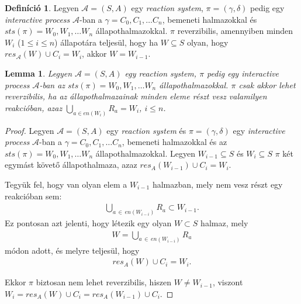 \documentclass[12pt]{article}
\theoremstyle{definition}
\newtheorem*{definition*}{Definíció}
\theoremstyle{remark}
\theoremstyle{plain}
\theoremstyle{plain}
\newtheorem*{lemma*}{Lemma}
\newcommand{\res}{\textit{res}}
\begin{document}
    \begin{definition*}
        Legyen $\mathscr{A} = (S, A)$ egy \textit{reaction system}, $\pi=(\gamma, \delta)$ pedig egy \textit{interactive process} $\mathscr{A}$-ban a $\gamma = C_{0}, C_{1}, \ldots C_{n}$, bemeneti halmazokkal és $\textit{sts}(\pi)=W_{0},W_{1},\ldots W_{n}$ állapothalmazokkal. $\pi$ reverzibilis, amennyiben minden $W_{i}$ ($1 \leq i \leq n$) állapotára teljesül, hogy ha $W \subseteq S$ olyan, hogy $res_{\mathscr{A}}(W) \cup C_{i} = W_{i}$, akkor $W = W_{i - 1}$.
    \end{definition*}

    \begin{lemma*}
        Legyen $\mathscr{A} = (S, A)$ egy \textit{reaction system}, $\pi$ pedig egy \textit{interactive process} $\mathscr{A}$-ban az $\textit{sts}(\pi)=W_{0},W_{1},\ldots W_{n}$ állapothalmazokkal. $\pi$ csak akkor lehet reverzibilis, ha az állapothalmazainak minden eleme részt vesz valamilyen reakcióban, azaz $\bigcup_{a \in \textit{en}(W_{i})} R_{a} = W_{i}$, $i \leq n$.
    \end{lemma*}

    \begin{proof}
        Legyen $\mathscr{A} = (S, A)$ egy \textit{reaction system} és $\pi=(\gamma, \delta)$ egy \textit{interactive process} $\mathscr{A}$-ban a $\gamma = C_{0}, C_{1}, \ldots C_{n}$, bemeneti halmazokkal és az $\textit{sts}(\pi)=W_{0},W_{1},\ldots W_{n}$ állapothalmazokkal. Legyen $W_{i - 1} \subseteq S$ és $W_{i} \subseteq S$ $\pi$ két egymást követő állapothalmaza, azaz $\res_{A}(W_{i-1}) \cup C_{i}=W_{i}$.
        
        Tegyük fel, hogy van olyan elem a $W_{i-1}$ halmazban, mely nem vesz részt egy reakcióban sem:
        \begin{align*}
            \bigcup_{a \,\in\, \textit{en}(W_{i-i})} R_{a} \subset W_{i-1}.
        \end{align*}
        Ez pontosan azt jelenti, hogy létezik egy olyan $W \subset S$ halmaz, mely
        \begin{align*}
            W = \bigcup_{a \,\in\, \textit{en}(W_{i-i})} R_{a}
        \end{align*}
        módon adott, és melyre teljesül, hogy
        \begin{align*}
            \res_{A}(W) \cup C_{i} = W_{i}.
        \end{align*}

        Ekkor $\pi$ biztosan nem lehet reverzibilis, hiszen $W \neq W_{i - 1}$, viszont $W_{i} = \res_{A}(W) \cup C_{i} = \res_{A}(W_{i - 1}) \cup C_{i}$.
    \end{proof}
\end{document}

